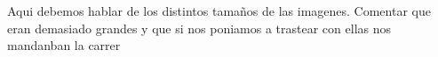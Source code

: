Aqui debemos hablar de los distintos tamaños de las imagenes. Comentar que eran demasiado grandes y que si nos poniamos a trastear con ellas nos mandanban la carrer    
